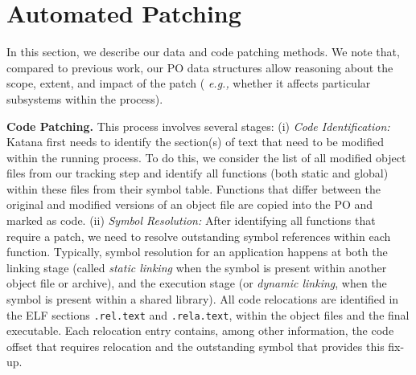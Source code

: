 \section{Automated Patching}

In this section, we describe our data and code patching methods.  We
note that, compared to previous work, our PO data structures
allow reasoning about the scope, extent, and impact of the patch ({\it
 e.g.,} whether it affects particular subsystems within the process).

{\bf Code Patching.} %
This process involves several stages:
\newline
(i) {\it Code Identification:} Katana first needs to identify the
section(s) of text that need to be modified within the running
process. To do this, we consider the list of all modified object files
from our tracking step and identify all functions (both static and
global) within these files 
from their symbol table. 
Functions that differ between the original
and modified versions of an object file are copied into the PO and
marked as code.
\newline
(ii) {\it Symbol Resolution:} After identifying all functions that
require a patch, we need to resolve outstanding symbol references
within each function. Typically, symbol resolution for an application
happens at both the linking stage (called {\it static linking} when
the symbol is present within another object file or archive), and the
execution stage (or {\it dynamic linking}, when the symbol is present
within a shared library).  All code relocations are identified in the
ELF sections {\tt .rel.text} and {\tt .rela.text}, within the object
files and the final executable.  Each relocation entry contains, among
other information, the code offset that requires relocation and the
outstanding symbol that provides this fix-up.

